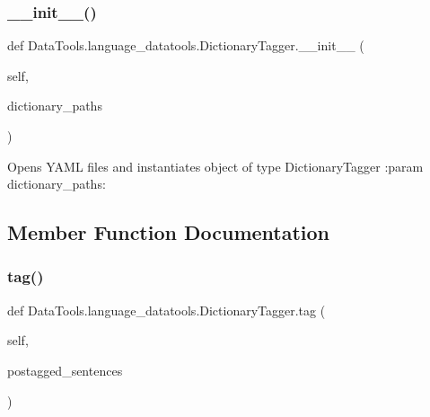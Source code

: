 \subsubsection{\texorpdfstring{\+\_\+\+\_\+init\+\_\+\+\_\+()}{\_\_init\_\_()}}
{\footnotesize\ttfamily def Data\+Tools.\+language\+\_\+datatools.\+Dictionary\+Tagger.\+\_\+\+\_\+init\+\_\+\+\_\+ (\begin{DoxyParamCaption}\item[{}]{self,  }\item[{}]{dictionary\+\_\+paths }\end{DoxyParamCaption})}

\begin{DoxyVerb}    Opens YAML files and instantiates object of type DictionaryTagger
:param dictionary_paths:
\end{DoxyVerb}
 

\subsection{Member Function Documentation}
\mbox{\label{class_data_tools_1_1language__datatools_1_1_dictionary_tagger_aa15c0e987509a72cb7ecc9c0a5ff39d7}} 
\subsubsection{\texorpdfstring{tag()}{tag()}}
{\footnotesize\ttfamily def Data\+Tools.\+language\+\_\+datatools.\+Dictionary\+Tagger.\+tag (\begin{DoxyParamCaption}\item[{}]{self,  }\item[{}]{postagged\+\_\+sentences }\end{DoxyParamCaption})}

